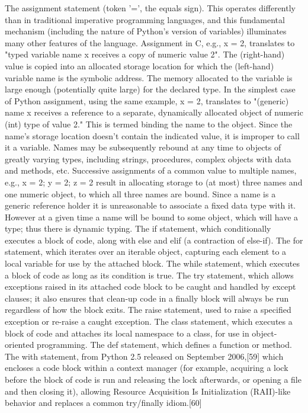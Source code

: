 \documentclass[conference]{IEEEtran} %
\begin{document}
    The assignment statement (token '=', the equals sign). This operates differently than in traditional imperative programming languages, and this fundamental mechanism (including the nature of Python's version of variables) illuminates many other features of the language. Assignment in C, e.g., x = 2, translates to "typed variable name x receives a copy of numeric value 2". The (right-hand) value is copied into an allocated storage location for which the (left-hand) variable name is the symbolic address. The memory allocated to the variable is large enough (potentially quite large) for the declared type. In the simplest case of Python assignment, using the same example, x = 2, translates to "(generic) name x receives a reference to a separate, dynamically allocated object of numeric (int) type of value 2." This is termed binding the name to the object. Since the name's storage location doesn't contain the indicated value, it is improper to call it a variable. Names may be subsequently rebound at any time to objects of greatly varying types, including strings, procedures, complex objects with data and methods, etc. Successive assignments of a common value to multiple names, e.g., x = 2; y = 2; z = 2 result in allocating storage to (at most) three names and one numeric object, to which all three names are bound. Since a name is a generic reference holder it is unreasonable to associate a fixed data type with it. However at a given time a name will be bound to some object, which will have a type; thus there is dynamic typing.
    The if statement, which conditionally executes a block of code, along with else and elif (a contraction of else-if).
    The for statement, which iterates over an iterable object, capturing each element to a local variable for use by the attached block.
    The while statement, which executes a block of code as long as its condition is true.
    The try statement, which allows exceptions raised in its attached code block to be caught and handled by except clauses; it also ensures that clean-up code in a finally block will always be run regardless of how the block exits.
    The raise statement, used to raise a specified exception or re-raise a caught exception.
    The class statement, which executes a block of code and attaches its local namespace to a class, for use in object-oriented programming.
    The def statement, which defines a function or method.
    The with statement, from Python 2.5 released on September 2006,[59] which encloses a code block within a context manager (for example, acquiring a lock before the block of code is run and releasing the lock afterwards, or opening a file and then closing it), allowing Resource Acquisition Is Initialization (RAII)-like behavior and replaces a common try/finally idiom.[60]
\end{document}
